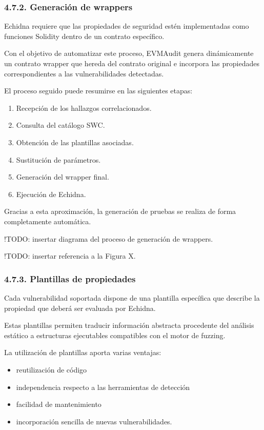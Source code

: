\subsubsection{4.7.2. Generación de
wrappers}\label{generaciuxf3n-de-wrappers}

Echidna requiere que las propiedades de seguridad estén implementadas
como funciones Solidity dentro de un contrato específico.

Con el objetivo de automatizar este proceso, EVMAudit genera
dinámicamente un contrato wrapper que hereda del contrato original e
incorpora las propiedades correspondientes a las vulnerabilidades
detectadas.

El proceso seguido puede resumirse en las siguientes etapas:

\begin{enumerate}
\def\labelenumi{\arabic{enumi}.}
\tightlist
\item
  Recepción de los hallazgos correlacionados.
\item
  Consulta del catálogo SWC.
\item
  Obtención de las plantillas asociadas.
\item
  Sustitución de parámetros.
\item
  Generación del wrapper final.
\item
  Ejecución de Echidna.
\end{enumerate}

Gracias a esta aproximación, la generación de pruebas se realiza de
forma completamente automática.

!TODO: insertar diagrama del proceso de generación de wrappers.

!TODO: insertar referencia a la Figura X.

\subsubsection{4.7.3. Plantillas de
propiedades}\label{plantillas-de-propiedades}

Cada vulnerabilidad soportada dispone de una plantilla específica que
describe la propiedad que deberá ser evaluada por Echidna.

Estas plantillas permiten traducir información abstracta procedente del
análisis estático a estructuras ejecutables compatibles con el motor de
fuzzing.

La utilización de plantillas aporta varias ventajas:

\begin{itemize}
\tightlist
\item
  reutilización de código
\item
  independencia respecto a las herramientas de detección
\item
  facilidad de mantenimiento
\item
  incorporación sencilla de nuevas vulnerabilidades.
\end{itemize}

